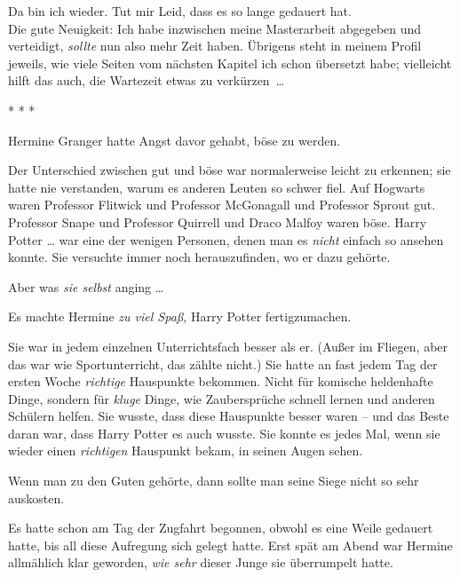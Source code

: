 

\hypertarget{rationalisierung}{%

Da bin ich wieder. Tut mir Leid, dass es so lange gedauert hat.\\ Die gute Neuigkeit: Ich habe inzwischen meine Masterarbeit abgegeben und verteidigt, \emph{sollte} nun also mehr Zeit haben. Übrigens steht in meinem Profil jeweils, wie viele Seiten vom nächsten Kapitel ich schon übersetzt habe; vielleicht hilft das auch, die Wartezeit etwas zu verkürzen~…

* * *

Hermine Granger hatte Angst davor gehabt, böse zu werden.

Der Unterschied zwischen gut und böse war normalerweise leicht zu erkennen; sie hatte nie verstanden, warum es anderen Leuten so schwer fiel. Auf Hogwarts waren Professor Flitwick und Professor McGonagall und Professor Sprout gut. Professor Snape und Professor Quirrell und Draco Malfoy waren böse. Harry Potter … war eine der wenigen Personen, denen man es \emph{nicht} einfach so ansehen konnte. Sie versuchte immer noch herauszufinden, wo er dazu gehörte.

Aber was \emph{sie selbst} anging …

Es machte Hermine \emph{zu viel Spaß}, Harry Potter fertigzumachen.

Sie war in jedem einzelnen Unterrichtsfach besser als er. (Außer im Fliegen, aber das war wie Sportunterricht, das zählte nicht.) Sie hatte an fast jedem Tag der ersten Woche \emph{richtige} Hauspunkte bekommen. Nicht für komische heldenhafte Dinge, sondern für \emph{kluge} Dinge, wie Zaubersprüche schnell lernen und anderen Schülern helfen. Sie wusste, dass diese Hauspunkte besser waren -- und das Beste daran war, dass Harry Potter es auch wusste. Sie konnte es jedes Mal, wenn sie wieder einen \emph{richtigen} Hauspunkt bekam, in seinen Augen sehen.

Wenn man zu den Guten gehörte, dann sollte man seine Siege nicht so sehr auskosten.

Es hatte schon am Tag der Zugfahrt begonnen, obwohl es eine Weile gedauert hatte, bis all diese Aufregung sich gelegt hatte. Erst spät am Abend war Hermine allmählich klar geworden, \emph{wie sehr} dieser Junge sie überrumpelt hatte.

}
